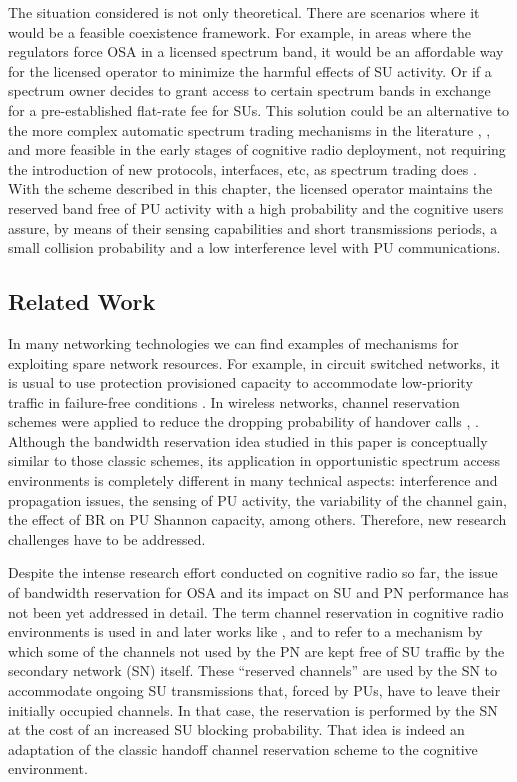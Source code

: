 The situation considered is not only theoretical. There are scenarios where it would be a feasible coexistence framework. For example, in areas where the regulators force OSA in a licensed spectrum band, it would be an affordable way for the licensed operator to minimize the harmful effects of SU activity. Or if a spectrum owner decides to grant access to certain spectrum bands in exchange for a pre-established flat-rate fee for SUs. This solution could be an alternative to the more complex automatic spectrum trading mechanisms in the literature \cite{ref:Gao2011}, \cite{ref:Yu2010}, and more feasible in the early stages of cognitive radio deployment, not requiring the introduction of new protocols, interfaces, etc, as spectrum trading does \cite{ref:Yang2011}. With the scheme described in this chapter, the licensed operator maintains the reserved band free of PU activity with a high probability and the cognitive users assure, by means of their sensing capabilities and short transmissions periods, a small collision probability and a low interference level with PU communications.
 
\subsection{Related Work}\label{sec:RelatedWork}
In many networking technologies we can find examples of mechanisms for exploiting spare network resources. For example, in circuit switched networks, it is usual to use protection provisioned capacity to accommodate low-priority traffic in failure-free conditions \cite{ref:CircuitSwitched}.
In wireless networks, channel reservation schemes were applied to reduce the dropping probability of handover calls \cite{ReservationHandoff}, \cite{ReservationHandoff2}. 
Although the bandwidth reservation idea studied in this paper is conceptually similar to those classic schemes, its application in opportunistic spectrum access environments is completely different in many technical aspects: interference and propagation issues, the sensing of PU activity, the variability of the channel gain, the effect of BR on PU Shannon capacity, among others. Therefore, new research challenges have to be addressed.

Despite the intense research effort conducted on cognitive radio so far, the issue of bandwidth reservation for OSA and its impact on SU and PN performance has not been yet addressed in detail.
The term channel reservation in cognitive radio environments is used in \cite{ref:Reservation} and later works like \cite{ref:Reservation2}, \cite{ref:Reservation3} and \cite{ref:Reservation3b} to refer to a mechanism by which some of the channels not used by the PN are kept free of SU traffic by the secondary network (SN) itself. These ``reserved channels'' are used by the SN to accommodate ongoing SU transmissions that, forced by PUs, have to leave their initially occupied channels. In that case, the reservation is performed by the SN at the cost of an increased SU blocking probability. That idea is indeed an adaptation of the classic handoff channel reservation scheme to the cognitive environment.

